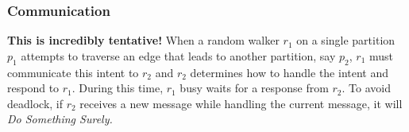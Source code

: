 \subsubsection{Communication}
\textbf{This is incredibly tentative!}
When a random walker $r_1$ on a single partition $p_1$ attempts to traverse an edge that leads to another partition, say $p_2$, $r_1$ must communicate this intent to $r_2$ and $r_2$ determines how to handle the intent and respond to $r_1$. During this time, $r_1$ busy waits for a response from $r_2$. To avoid deadlock, if $r_2$ receives a new message while handling the current message, it will \textit{Do Something Surely.}

